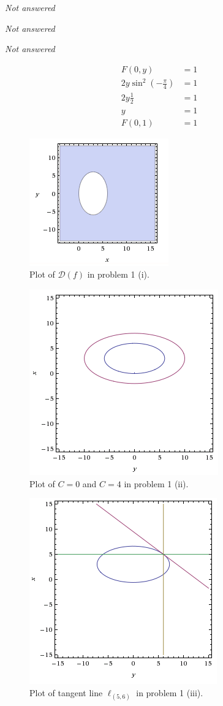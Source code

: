 \documentclass[a4paper,norsk,12pt]{article}
\begin{document}
\textit{Not answered}

\textit{Not answered}

\textit{Not answered}

\begin{align*}
  F(0,y) &= 1 \\
  2y \sin^2(-\frac{\pi}{4}) &= 1 \\
  2y\frac{1}{2} &= 1 \\
  y &= 1 \\
  F(0,1) &= 1
\end{align*}

\begin{figure}[h]
  \centering
  \includegraphics{ob1plot.png}
  \caption{Plot of $\mathcal{D}(f)$ in problem 1 (i).}
  \label{plot.p1}
\end{figure}

\begin{figure}[h]
  \centering
  \includegraphics{ob1plot2.png}
  \caption{Plot of $C=0$ and $C=4$ in problem 1 (ii).}
  \label{plot.p2}
\end{figure}

\begin{figure}[h]
  \centering
  \includegraphics{ob1plot3.png}
  \caption{Plot of tangent line $\ell_{(5,6)}$ in problem 1 (iii).}
  \label{plot.p3}
\end{figure}
\end{document}
